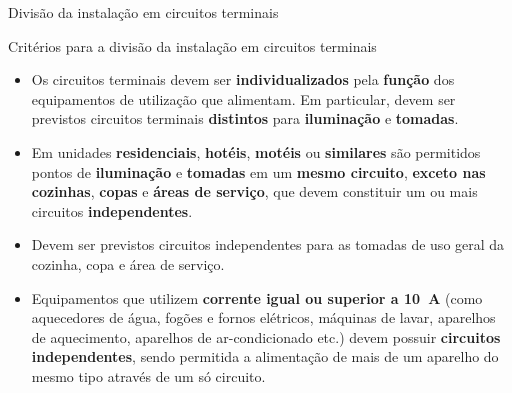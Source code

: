 \begin{frame}{Divisão da instalação em circuitos terminais}
	\begin{block}{Critérios para a divisão da instalação em circuitos terminais}
		\begin{itemize}
			\item Os circuitos terminais devem ser \textbf{individualizados} pela \textbf{função} dos equipamentos de utilização que alimentam. Em particular, devem ser previstos circuitos terminais \textbf{distintos} para \textbf{iluminação} e \textbf{tomadas}.
			\item Em unidades \textbf{residenciais}, \textbf{hotéis}, \textbf{motéis }ou \textbf{similares }são permitidos pontos de \textbf{iluminação }e \textbf{tomadas }em um \textbf{mesmo circuito}, \textbf{exceto nas cozinhas}, \textbf{copas }e \textbf{áreas de serviço}, que devem constituir um ou mais circuitos \textbf{independentes}.
			\item Devem ser previstos circuitos independentes para as tomadas de uso geral da cozinha, copa e área de serviço.
			\item Equipamentos que utilizem \textbf{corrente igual ou superior a \SI{10}{\ampere} }(como aquecedores de água, fogões e fornos elétricos, máquinas de lavar, aparelhos de aquecimento, aparelhos de ar-condicionado etc.) devem possuir \textbf{circuitos independentes}, sendo permitida a alimentação de mais de um aparelho do mesmo tipo através de um só circuito.
		\end{itemize}
	\end{block}
\end{frame}


